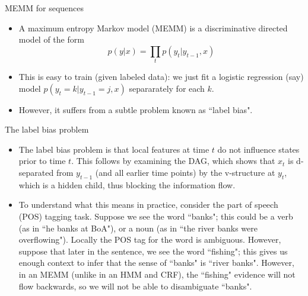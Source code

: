 \documentclass[10pt,mathserif]{beamer}
\begin{document}
\begin{frame}{MEMM for sequences}
\begin{itemize}
    \item A maximum entropy Markov model (MEMM) is a discriminative directed model of the form
    \begin{equation}
        p(y|x) =   \prod_t p(y_t |y_{t-1}, x)
    \end{equation}
    
    \item This is easy to train (given labeled data): we just fit a logistic regression (say) model $p(y_t = k|y_{t-1} = j,x)$ separarately for each $k$.
    \item However, it suffers from a subtle problem known as ``label bias".
\end{itemize}
\end{frame}

\begin{frame}{The label bias problem}
\begin{itemize}
    \item The label bias problem is that local features at time $t$ do not influence states prior to time $t$. This follows by examining the DAG, which shows that $x_t$ is d-separated from $y_{t-1}$ (and all earlier time points) by the v-structure at $y_t$, which is a hidden child, thus blocking the information flow.
    \item To understand what this means in practice, consider the part of speech (POS) tagging task. Suppose we see the word ``banks"; this could be a verb (as in ``he banks at BoA"), or a noun (as in ``the river banks were overflowing"). Locally the POS tag for the word is ambiguous. However, suppose that later in the sentence, we see the word ``fishing"; this gives us enough context to infer that the sense of ``banks" is ``river banks". However, in an MEMM (unlike in an HMM and CRF), the ``fishing" evidence will not flow backwards, so we will not be able to disambiguate ``banks". 
\end{itemize}
\end{frame}
\end{document}
